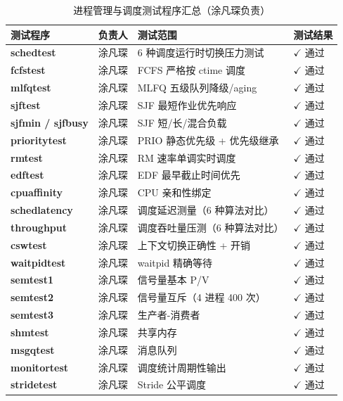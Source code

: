 \documentclass[12pt,a4paper]{ctexart}
\begin{document}
\begin{table}[H]
\centering
\caption{进程管理与调度测试程序汇总（涂凡琛负责）}
\small
\begin{tabular}{>{\bfseries}p{3cm}p{2.2cm}p{4.5cm}p{2.5cm}}
\toprule
\textbf{测试程序} & \textbf{负责人} & \textbf{测试范围} & \textbf{测试结果} \\
\midrule
schedtest      & 涂凡琛 & 6 种调度运行时切换压力测试            & $\checkmark$ 通过 \\
fcfstest       & 涂凡琛 & FCFS 严格按 ctime 调度                & $\checkmark$ 通过 \\
mlfqtest       & 涂凡琛 & MLFQ 五级队列降级/aging               & $\checkmark$ 通过 \\
sjftest        & 涂凡琛 & SJF 最短作业优先响应                  & $\checkmark$ 通过 \\
sjfmin / sjfbusy & 涂凡琛 & SJF 短/长/混合负载                   & $\checkmark$ 通过 \\
prioritytest   & 涂凡琛 & PRIO 静态优先级 + 优先级继承           & $\checkmark$ 通过 \\
rmtest         & 涂凡琛 & RM 速率单调实时调度                   & $\checkmark$ 通过 \\
edftest        & 涂凡琛 & EDF 最早截止时间优先                  & $\checkmark$ 通过 \\
cpuaffinity    & 涂凡琛 & CPU 亲和性绑定                        & $\checkmark$ 通过 \\
schedlatency   & 涂凡琛 & 调度延迟测量（6 种算法对比）          & $\checkmark$ 通过 \\
throughput     & 涂凡琛 & 调度吞吐量压测（6 种算法对比）        & $\checkmark$ 通过 \\
cswtest        & 涂凡琛 & 上下文切换正确性 + 开销               & $\checkmark$ 通过 \\
waitpidtest    & 涂凡琛 & waitpid 精确等待                      & $\checkmark$ 通过 \\
semtest1       & 涂凡琛 & 信号量基本 P/V                        & $\checkmark$ 通过 \\
semtest2       & 涂凡琛 & 信号量互斥（4 进程 400 次）            & $\checkmark$ 通过 \\
semtest3       & 涂凡琛 & 生产者-消费者                         & $\checkmark$ 通过 \\
shmtest        & 涂凡琛 & 共享内存                              & $\checkmark$ 通过 \\
msgqtest       & 涂凡琛 & 消息队列                              & $\checkmark$ 通过 \\
monitortest    & 涂凡琛 & 调度统计周期性输出                    & $\checkmark$ 通过 \\
stridetest     & 涂凡琛 & Stride 公平调度                       & $\checkmark$ 通过 \\
\bottomrule
\end{tabular}
\end{table}
\end{document}
